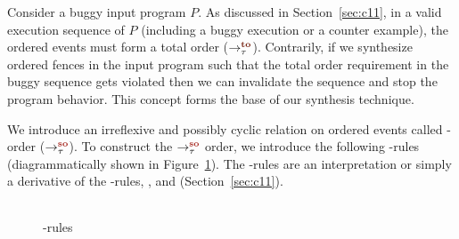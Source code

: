 Consider a buggy input program $P$.
%
As discussed in Section~\ref{sec:c11}, in a valid \cc execution 
sequence of $P$ (including a buggy execution or a counter example), 
the \sc ordered events must form a total order ($\setTO$).
%
Contrarily, if we synthesize \sc ordered fences in the input program 
such that the total order requirement in the buggy sequence gets violated 
then we can invalidate the sequence and stop the program behavior.
This concept forms the base of our synthesis technique.

We introduce an irreflexive and possibly cyclic relation
on \sc ordered events called \sc-order ($\setSO$).
%
To construct the $\setSO$ order, we introduce the following \lso-rules
(diagrammatically shown in Figure~\ref{fig:so rules}).
The \lso-rules are an interpretation or simply a derivative of the 
\lto-rules, ,  and  
(Section~\ref{sec:c11}).

\begin{figure}[t]
	\begin{tabular}{|c|c|c|c|c|}
		\hline
		\resizebox{0.19\textwidth}{!}{} &
		\resizebox{0.19\textwidth}{!}{} &
		\resizebox{0.19\textwidth}{!}{} &
		\resizebox{0.19\textwidth}{!}{} &
		\resizebox{0.19\textwidth}{!}{} \\
		\hline
	\end{tabular}
	\caption{\lso-rules}
	\label{fig:so rules}
\end{figure}

